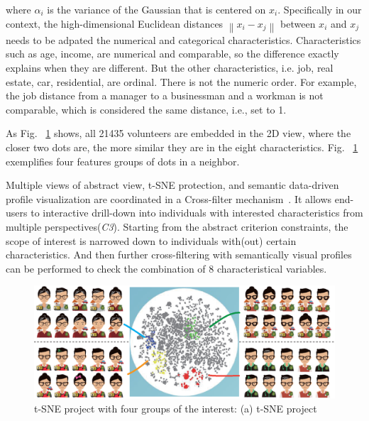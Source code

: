 \documentclass{ieeeaccess}
\begin{document}
where $\alpha_i$ is the variance of the Gaussian that is centered on $x_i$. Specifically in our context, the high-dimensional Euclidean distances $\left \| x_i - x_j \right \|$ between $x_i$ and $x_j$ needs to be adpated the numerical and categorical characteristics. Characteristics such as age, income, are numerical and comparable, so the difference exactly explains when they are different. But the other characteristics, i.e. job, real estate, car, residential, are ordinal. There is not the numeric order. For example, the job distance from a manager to a businessman and a workman is not comparable, which is considered the same distance, i.e., set to 1.

As Fig. ~\ref{fig:tsne} shows, all 21435 volunteers are embedded in the 2D view, where the closer two dots are, the more similar they are in the eight characteristics. Fig. ~\ref{fig:tsne} exemplifies four features groups of dots in a neighbor.

Multiple views of abstract view, t-SNE protection, and semantic data-driven profile visualization are coordinated in a Cross-filter mechanism~\cite{Weaver2010}. It allows end-users to interactive drill-down into individuals with interested characteristics from multiple perspectives(\textit{C3}). Starting from the abstract criterion constraints, the scope of interest is narrowed down to individuals with(out) certain characteristics. And then further cross-filtering with semantically visual profiles can be performed to check the combination of 8 characteristical variables.

\begin{figure}[htb!]
 \centering %
 \includegraphics[width=\columnwidth]{pictures/tsne}
 \caption{t-SNE project with four groups of the interest: (a) t-SNE project }
 \label{fig:tsne}
\end{figure}
\end{document}

